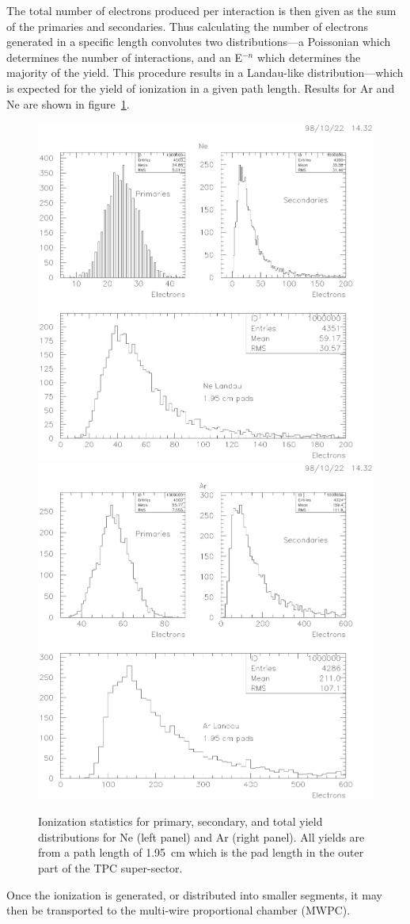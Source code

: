 \documentclass{article}
\begin{document}
The total number of electrons produced per interaction is
then given as the sum of the primaries and secondaries.
Thus calculating the number of electrons generated in a specific
length convolutes two distributions---a Poissonian which determines
the number of interactions, and an E$^{-n}$ which determines
the majority of the yield.  This procedure results in 
a Landau-like distribution---which is expected for the yield of 
ionization in a given path length.  Results for Ar and Ne are
shown in figure~\ref{fig:landauGases}.
\begin{figure}[htb]
\begin{center}
\includegraphics[bbllx=33pt,bblly=150pt,bburx=569pt,bbury=698pt,width=.45\textwidth]{./pics/landauNe.ps}
\includegraphics[bbllx=33pt,bblly=150pt,bburx=569pt,bbury=698pt,width=.45\textwidth]{./pics/landauAr.ps}
\caption{Ionization statistics for primary, secondary, and total yield
  distributions for Ne (left panel) and Ar (right panel).  All yields
  are from a path length of 1.95~cm which is the pad length in the
  outer part of the TPC super-sector.}
\label{fig:landauGases}
\end{center}
\end{figure}
Once the ionization is generated, or distributed into smaller
segments, it may then be transported to the multi-wire proportional
chamber (MWPC).
\end{document}
